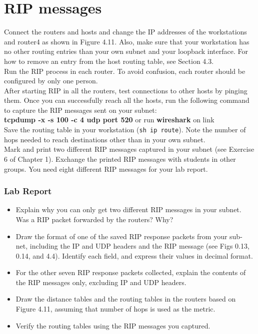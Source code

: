 \documentclass[10pt,a4paper]{article}
\numberwithin{equation}{section}
\numberwithin{figure}{section}
\numberwithin{table}{section}
\begin{document}
\section{RIP messages}
    Connect the routers and hosts and change the IP addresses of the workstations and router4 as shown in Figure 4.11.
    Also, make sure that your workstation has no other routing entries than your own subnet and your loopback interface.
    For how to remove an entry from the host routing table, see Section 4.3. \\
    Run the RIP process in each router.
    To avoid confusion, each router should be configured by only one person. \\
    After starting RIP in all the routers, test connections to other hosts by pinging them.
    Once you can successfully reach all the hosts, run the following command to capture the RIP messages sent on your subnet: \\
    \textbf{tcpdump -x -s 100 -c 4 udp port 520} or run \textbf{wireshark} on link \\
    Save the routing table in your workstation (\texttt{sh ip route}).
    Note the number of hops needed to reach destinations other than in your own subnet. \\
    Mark and print two different RIP messages captured in your subnet (see Exercise 6 of Chapter 1).
    Exchange the printed RIP messages with students in other groups.
    You need eight different RIP messages for your lab report.
    \subsubsection*{Lab Report}
    \begin{itemize}
        \setlength{\itemindent}{0pt}
        \item Explain why you can only get two different RIP messages in your subnet.
        Was a RIP packet forwarded by the routers?
        Why?
        \item Draw the format of one of the saved RIP response packets from your sub- net, including the IP and UDP headers and the RIP message (see Figs 0.13, 0.14, and 4.4). Identify each field, and express their values in decimal format.
        \item For the other seven RIP response packets collected, explain the contents of the RIP messages only, excluding IP and UDP headers.
    \end{itemize}
    \begin{itemize}
        \setlength{\itemindent}{0pt}
        \item Draw the distance tables and the routing tables in the routers based on Figure 4.11, assuming that number of hops is used as the metric.
        \item Verify the routing tables using the RIP messages you captured.
    \end{itemize}
\end{document}
